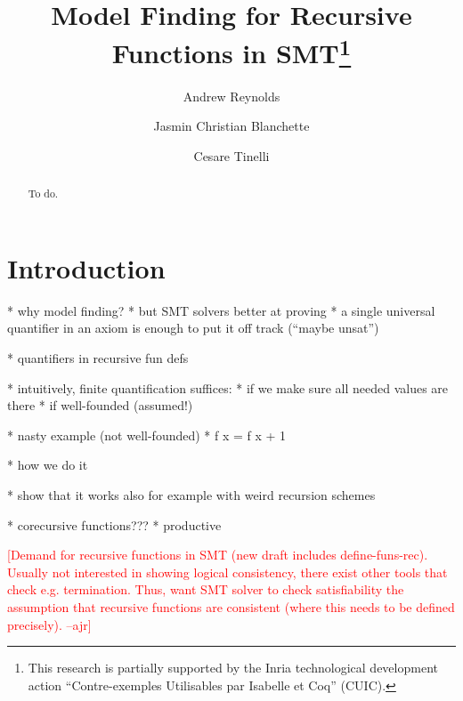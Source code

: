 \documentclass[runningheads,a4paper]{llncs}
\newcommand{\rem}[1]{\textcolor{red}{[#1]}}
\newcommand{\ajr}[1]{\rem{#1 --ajr}}
\begin{document}
\title{Model Finding for Recursive Functions in SMT\thanks{%
This research is partially supported by the Inria technological development
action ``Contre-exemples Utilisables par Isabelle et Coq'' (CUIC).
}
}

\author {Andrew Reynolds \and Jasmin Christian Blanchette \and Cesare Tinelli }

\maketitle

\begin{abstract}
To do.
\end{abstract}

\section{Introduction}
\label{sec:introduction}

  * why model finding?
  * but SMT solvers better at proving
    * a single universal quantifier in an axiom is enough to put it off track
      (``maybe unsat'')

  * quantifiers in recursive fun defs

  * intuitively, finite quantification suffices:
    * if we make sure all needed values are there
    * if well-founded (assumed!)

  * nasty example (not well-founded)
    * f x = f x + 1

  * how we do it

  * show that it works also for example with weird recursion schemes

  * corecursive functions???
    * productive


\ajr{Demand for recursive functions in SMT (new draft includes
define-funs-rec). Usually not interested in showing logical consistency, there
exist other tools that check e.g. termination.
Thus, want SMT solver to check satisfiability the assumption that recursive
functions are consistent (where this needs to be defined precisely).
}
\end{document}
